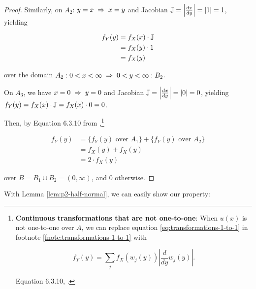 \documentclass{article}
\begin{document}
\begin{proof}
  Similarly, on $A_2$: $y = x \;\Rightarrow\; x = y$ and Jacobian $\mathbb{J} = \left|
  \frac{dx}{dy} \right| = |1| = 1$, yielding

  \begin{align*}
    f_Y(y) &= f_X(x) \cdot \mathbb{J} \\
    &= f_X(y) \cdot 1 \\
    &= f_X(y)
  \end{align*}

  over the domain $A_2: 0 < x < \infty \;\Rightarrow\; 0 < y < \infty :B_2$.

  On $A_3$, we have $x = 0 \;\Rightarrow\; y = 0$ and Jacobian $\mathbb{J} = \left| \frac{dx}{dy}
  \right| = |0| = 0$, yielding $f_Y(y) = f_X(x) \cdot \mathbb{J} = f_X(x) \cdot 0 = 0$.

  Then, by Equation 6.3.10 from \citet{textbook},\footnote{\textbf{Continuous
  transformations that are not one-to-one}: When $u(x)$ is not one-to-one over
  $A$, we can replace equation \eqref{eq:transformations-1-to-1} in footnote
  \ref{fnote:transformations-1-to-1} with 

  \begin{equation*}
    f_Y(y) = \sum_j f_X(w_j(y)) \left| \frac{d}{dy} w_j(y) \right|.
  \end{equation*}

  Equation 6.3.10, \citet{textbook}.
  }

  \begin{align*}
    f_Y(y) &= \{ f_Y(y) \textrm{ over } A_1 \} + \{ f_Y(y) \textrm{ over } A_2 \} \\
    &= f_X(y) + f_X(y) \\
    &= 2 \cdot f_X(y)
  \end{align*}

  over $B = B_1 \cup B_2 = (0, \infty)$, and 0 otherwise.
\end{proof}

With Lemma \ref{lem:p2-half-normal}, we can easily show our property:
\end{document}

